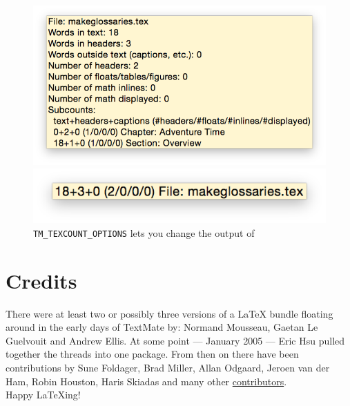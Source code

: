 \documentclass[11pt, x11names]{article}
\begin{document}
\begin{description}
    \begin{figure}[htbp]
        \begin{minipage}[t]{0.5\textwidth}
          \vspace{0cm}
          \centering
            \includegraphics[width=\textwidth]{Figures/TeXcount - Default Options.png}
        \end{minipage}
        \begin{minipage}[t]{0.5\textwidth}
          \vspace{0cm}
          \centering
            \includegraphics[width=\textwidth]{Figures/TeXcount - Custom Options}
        \end{minipage}

        \caption{\texttt{TM\_TEXCOUNT\_OPTIONS} lets you change the output of }
        \label{fig:TeXcount}
    \end{figure}

\end{description}

\section{Credits}

There were at least two or possibly three versions of a LaTeX bundle floating around in the early days of TextMate by: Normand Mousseau, Gaetan Le Guelvouit and Andrew Ellis. At some point — January 2005 — Eric Hsu pulled together the threads into one package. From then on there have been contributions by Sune Foldager, Brad Miller, Allan Odgaard, Jeroen van der Ham, Robin Houston, Haris Skiadas and many other \href{https://github.com/textmate/latex.tmbundle/graphs/contributors}{contributors}.\\

Happy LaTeXing!
\end{document}

